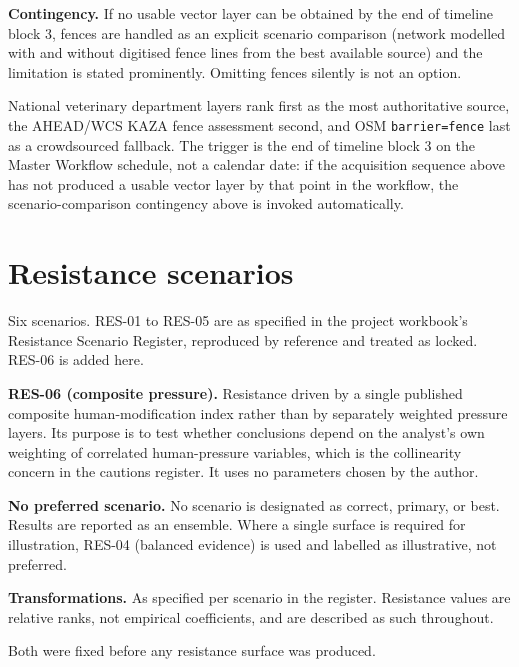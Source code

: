 \textbf{Contingency.} If no usable vector layer can be obtained by the end of
timeline block 3, fences are handled as an explicit scenario comparison (network
modelled with and without digitised fence lines from the best available source)
and the limitation is stated prominently. Omitting fences silently is not an
option.

 National
veterinary department layers rank first as the most authoritative source, the
AHEAD/WCS KAZA fence assessment second, and OSM \texttt{barrier=fence} last as a
crowdsourced fallback. The trigger is the end of timeline block 3 on the Master
Workflow schedule, not a calendar date: if the acquisition sequence above has
not produced a usable vector layer by that point in the workflow, the
scenario-comparison contingency above is invoked automatically.

\section{Resistance scenarios}

Six scenarios. RES-01 to RES-05 are as specified in the project workbook's
Resistance Scenario Register, reproduced by reference and treated as locked.
RES-06 is added here.

\textbf{RES-06 (composite pressure).} Resistance driven by a single published
composite human-modification index rather than by separately weighted pressure
layers. Its purpose is to test whether conclusions depend on the analyst's own
weighting of correlated human-pressure variables, which is the collinearity
concern in the cautions register. It uses no parameters chosen by the author.

\textbf{No preferred scenario.} No scenario is designated as correct, primary,
or best. Results are reported as an ensemble. Where a single surface is required
for illustration, RES-04 (balanced evidence) is used and labelled as
illustrative, not preferred.

\textbf{Transformations.} As specified per scenario in the register. Resistance
values are relative ranks, not empirical coefficients, and are described as such
throughout.

 Both were
fixed before any resistance surface was produced.

